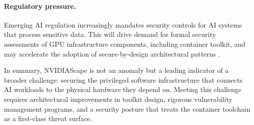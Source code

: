 \paragraph{Regulatory pressure.} Emerging AI regulation increasingly mandates security controls for AI systems that process sensitive data. This will drive demand for formal security assessments of GPU infrastructure components, including container toolkit, and may accelerate the adoption of secure-by-design architectural patterns \cite{eu_ai_act}.
 
In summary, NVIDIAScape is not an anomaly but a leading indicator of a broader challenge: securing the privileged software infrastructure that connects AI workloads to the physical hardware they depend on. Meeting this challenge requires architectural improvements in toolkit design, rigorous vulnerability management programs, and a security posture that treats the container toolchain as a first-class threat surface.